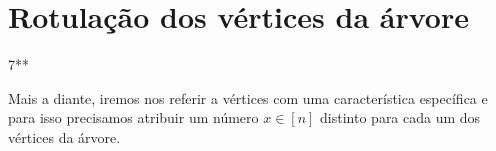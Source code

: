 \documentclass[a4paper,12pt]{article}
\begin{document}
	\section {Rotulação dos vértices da árvore} 7**

		Mais a diante, iremos nos referir a vértices com uma característica específica e para isso precisamos
		atribuir um número $x\in [n]$ distinto para cada um 
		dos vértices da árvore.

		

	
	
\end{document}
